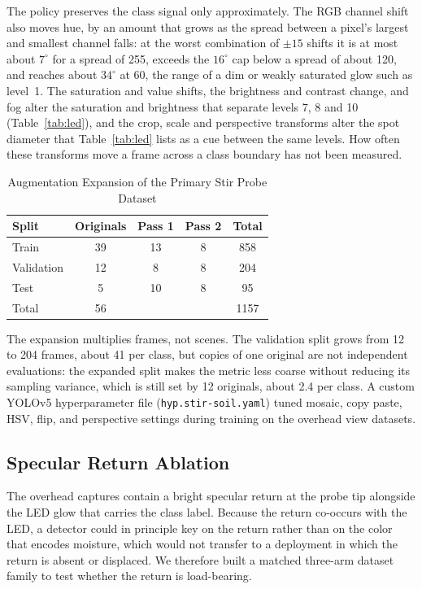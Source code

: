 ﻿\documentclass[journal]{IEEEtran}
\begin{document}
The policy preserves the class signal only approximately. The RGB channel shift also moves hue, by an amount that grows as the spread between a pixel's largest and smallest channel falls: at the worst combination of $\pm 15$ shifts it is at most about $7^{\circ}$ for a spread of 255, exceeds the $16^{\circ}$ cap below a spread of about 120, and reaches about $34^{\circ}$ at 60, the range of a dim or weakly saturated glow such as level~1. The saturation and value shifts, the brightness and contrast change, and fog alter the saturation and brightness that separate levels 7, 8 and 10 (Table~\ref{tab:led}), and the crop, scale and perspective transforms alter the spot diameter that Table~\ref{tab:led} lists as a cue between the same levels. How often these transforms move a frame across a class boundary has not been measured.

\begin{table}[!t]
\renewcommand{\arraystretch}{1.3}
\caption{Augmentation Expansion of the Primary Stir Probe Dataset}
\label{tab:aug}
\centering
\begin{tabular}{l c c c c}
\toprule
\textbf{Split} & \textbf{Originals} & \textbf{Pass 1} & \textbf{Pass 2} & \textbf{Total} \\
\midrule
Train      & 39 & 13 & 8 & 858 \\
Validation & 12 & 8  & 8 & 204 \\
Test       & 5  & 10 & 8 & 95 \\
\midrule
Total      & 56 &    &   & 1157 \\
\bottomrule
\end{tabular}
\end{table}

The expansion multiplies frames, not scenes. The validation split grows from 12 to 204 frames, about 41 per class, but copies of one original are not independent evaluations: the expanded split makes the metric less coarse without reducing its sampling variance, which is still set by 12 originals, about 2.4 per class. A custom YOLOv5 hyperparameter file (\texttt{hyp.stir-soil.yaml}) tuned mosaic, copy paste, HSV, flip, and perspective settings during training on the overhead view datasets.

\subsection{Specular Return Ablation}
\label{sec:ablation-method}
The overhead captures contain a bright specular return at the probe tip alongside the LED glow that carries the class label. Because the return co-occurs with the LED, a detector could in principle key on the return rather than on the color that encodes moisture, which would not transfer to a deployment in which the return is absent or displaced. We therefore built a matched three-arm dataset family to test whether the return is load-bearing.
\end{document}
